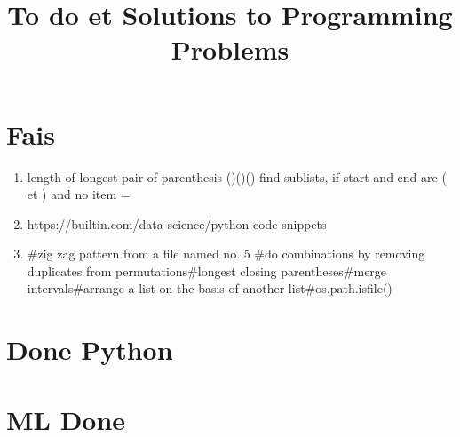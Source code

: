 \documentclass{article}
\title {To do et Solutions to Programming Problems}
\begin{document}
\maketitle

\section {Fais}
\begin{enumerate}

\item length of longest pair of  parenthesis ()()()
find sublists, if start and end are ( et ) and no item =
\item https://builtin.com/data-science/python-code-snippets
\item #zig zag pattern from a file named no. 5 #do combinations by removing duplicates from permutations#longest closing parentheses#merge intervals#arrange a list on the basis of another list#os.path.isfile()

\end{enumerate}

\section{Done Python}

\section {ML Done}
\end{document}

